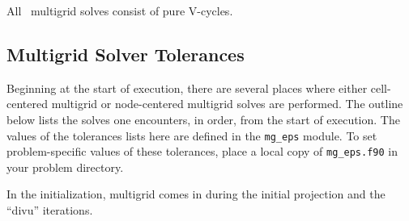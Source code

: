 All \maestro\ multigrid solves consist of pure V-cycles.  


\subsection{Multigrid Solver Tolerances}

\label{sec:mgtol}

Beginning at the start of execution, there are several places where
either cell-centered multigrid or node-centered multigrid solves are
performed.  The outline below lists the solves one encounters, in order,
from the start of execution.  The values of the tolerances lists here
are defined in the {\tt mg\_eps} module.  To set problem-specific values
of these tolerances, place a local copy of {\tt mg\_eps.f90} in your
problem directory.

In the initialization, multigrid comes in during the initial projection
and the ``divu'' iterations.

